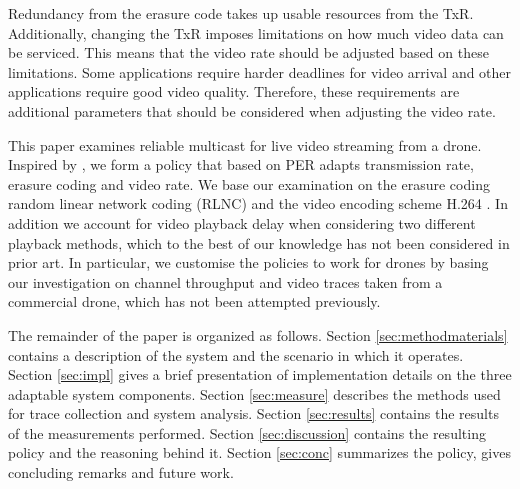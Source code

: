 	Redundancy from the erasure code takes up usable resources from the TxR. Additionally, changing the TxR imposes limitations on how much video data can be serviced. This means that the video rate should be adjusted based on these limitations. Some applications require harder deadlines for video arrival and other applications require good video quality. Therefore, these requirements are additional parameters that should be considered when adjusting the video rate. 
	
This paper examines reliable multicast for live video streaming from a drone. Inspired by \cite{vid_rate}, we form a policy that based on PER adapts transmission rate, erasure coding and video rate. We base our examination on the erasure coding random linear network coding (RLNC) \cite{randomnc} and the video encoding scheme H.264 \cite{H264}. In addition we account for video playback delay when considering two different playback methods, which to the best of our knowledge has not been considered in prior art. In particular, we customise the policies to work for drones by basing our investigation on channel throughput and video traces taken from a commercial drone, which has not been attempted previously. %
%

	The remainder of the paper is organized as follows. Section \ref{sec:methodmaterials} contains a description of the system and the scenario in which it operates. Section \ref{sec:impl} gives a brief presentation of implementation details on the three adaptable system components. Section \ref{sec:measure} describes the methods used for trace collection and system analysis. Section \ref{sec:results} contains the results of the measurements performed. Section \ref{sec:discussion} contains the resulting policy and the reasoning behind it. Section \ref{sec:conc} summarizes the policy, gives concluding remarks and future work.


